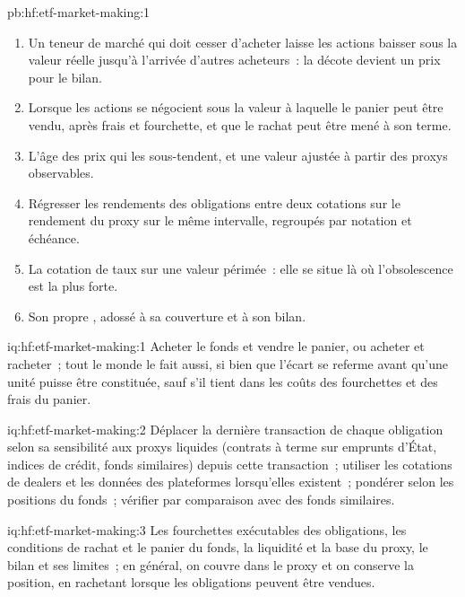 \begin{solution}{pb:hf:etf-market-making:1}
\begin{enumerate}
\item Un teneur de marché qui doit cesser d'acheter laisse les actions baisser sous la valeur réelle jusqu'à l'arrivée d'autres acheteurs~:
la décote devient un prix pour le bilan.
\item Lorsque les actions se négocient sous la valeur à laquelle le panier peut être vendu, après frais et fourchette, et que le rachat peut être mené à son terme.
\item L'âge des prix qui les sous-tendent, et une valeur ajustée à partir des proxys observables.
\item Régresser les rendements des obligations entre deux cotations sur le rendement du proxy sur le même intervalle, regroupés par notation et échéance.
\item La cotation de taux sur une valeur périmée~: elle se situe là où l'obsolescence est la plus forte.
\item Son propre , adossé à sa couverture et à son bilan.
\end{enumerate}
\end{solution}

\begin{solution}{iq:hf:etf-market-making:1}
Acheter le fonds et vendre le panier, ou acheter et racheter~; tout le monde le fait aussi, si bien que l'écart se referme avant qu'une unité puisse être
constituée, sauf s'il tient dans les coûts des fourchettes et des frais du panier.
\end{solution}

\begin{solution}{iq:hf:etf-market-making:2}
Déplacer la dernière transaction de chaque obligation selon sa sensibilité aux proxys liquides (contrats à terme sur emprunts d'État, indices de crédit, fonds similaires)
depuis cette transaction~; utiliser les cotations de dealers et les données des plateformes lorsqu'elles existent~; pondérer selon les positions du fonds~; vérifier par comparaison avec des fonds similaires.
\end{solution}

\begin{solution}{iq:hf:etf-market-making:3}
Les fourchettes exécutables des obligations, les conditions de rachat et le panier du fonds, la liquidité et la base du proxy, le bilan et ses limites~;
en général, on couvre dans le proxy et on conserve la position, en rachetant lorsque les obligations peuvent être vendues.
\end{solution}


